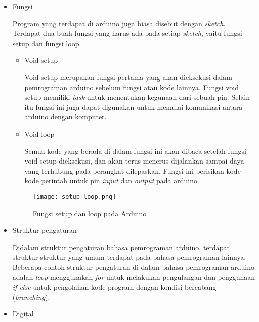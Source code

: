 \begin{itemize}
    \item Fungsi
    
    Program yang terdapat di arduino juga biasa disebut dengan \textit{sketch}. Terdapat dua buah fungsi yang harus ada pada setiap \textit{sketch}, yaitu fungsi setup dan fungsi loop.
    
        \begin{itemize}
            \item Void setup
            \label{void setup}
            
            Void setup merupakan fungsi pertama yang akan dieksekusi dalam pemrograman arduino sebelum fungsi atau kode lainnya. Fungsi void setup memiliki \textit{task} untuk menentukan kegunaan dari sebuah pin. Selain itu fungsi ini juga dapat digunakan untuk memulai komunikasi antara arduino dengan komputer.
            
            
            \item Void loop
            
            Semua kode yang berada di dalam fungsi ini akan dibaca setelah fungsi void setup dieksekusi, dan akan terus menerus dijalankan sampai daya yang terhubung pada perangkat dilepaskan. Fungsi ini berisikan kode-kode perintah untuk pin \textit{input} dan \textit{output} pada arduino.
            
        \end{itemize}
        
        \begin{figure}[H]
        	\centering  
        	\texttt{[image: setup\_loop.png]}  
        	\caption[Fungsi setup dan loop pada Arduino]{Fungsi setup dan loop pada Arduino} 
        	\label{fig:Fungsi setup dan loop pada Arduino} 
        \end{figure}
    
    \item Struktur pengaturan
    
    Didalam struktur pengaturan bahasa pemrograman arduino, terdapat struktur-struktur yang umum terdapat pada bahasa pemrograman lainnya. Beberapa contoh struktur pengaturan di dalam bahasa pemrograman arduino adalah \textit{loop} menggunakan \textit{for} untuk melakukan pengulangan dan penggunaan \textit{if-else} untuk pengolahan kode program dengan kondisi bercabang (\textit{branching}).
    
    \item Digital
    

\end{itemize}
